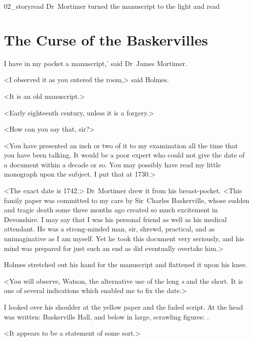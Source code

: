 
\begin{withfootnotes}
	\cleardoubleevenpage
	\begin{bwbigpic}
	[1.0] 
		{02_storyread}
		{Dr~Mortimer turned the manuscript to the light and read}
	\end{bwbigpic}
\end{withfootnotes}

\chapter{The Curse of the Baskervilles}
\lettrine[ante=`]{I}{} have in my pocket a manuscript,' said Dr~James Mortimer.

\zz
<I observed it as you entered the room,> said Holmes.

\zz
<It is an old manuscript.>

\zz
<Early eighteenth century, unless it is a forgery.>

<How can you say that, sir?>

<You have presented an inch or two of it to my examination all the time that you have been talking. It would be a poor expert who could not give the date of a document within a decade or so. You may possibly have read my little monograph upon the subject. I put that at 1730.>

<The exact date is 1742.> Dr~Mortimer drew it from his breast-pocket. <This family paper was committed to my care by Sir~Charles Baskerville, whose sudden and tragic death some three months ago created so much excitement in Devonshire. I may say that I was his personal friend as well as his medical attendant. He was a strong-minded man, sir, shrewd, practical, and as unimaginative as I am myself. Yet he took this document very seriously, and his mind was prepared for just such an end as did eventually overtake him.>

Holmes stretched out his hand for the manuscript and flattened it upon his knee.

<You will observe, Watson, the alternative use of the long \textit{s} and the short. It is one of several indications which enabled me to fix the date.>

I looked over his shoulder at the yellow paper and the faded script. At the head was written: \oldfont Baskerville Hall\normalfont, and below in large, scrawling figures: . \normalfont

<It appears to be a statement of some sort.>

